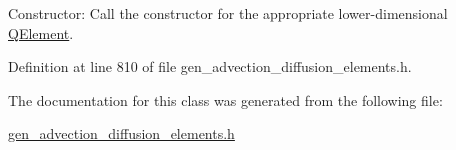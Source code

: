 Constructor\+: Call the constructor for the appropriate lower-\/dimensional \hyperlink{classoomph_1_1QElement}{Q\+Element}. 



Definition at line 810 of file gen\+\_\+advection\+\_\+diffusion\+\_\+elements.\+h.



The documentation for this class was generated from the following file\+:\begin{DoxyCompactItemize}
\item 
\hyperlink{gen__advection__diffusion__elements_8h}{gen\+\_\+advection\+\_\+diffusion\+\_\+elements.\+h}\end{DoxyCompactItemize}
